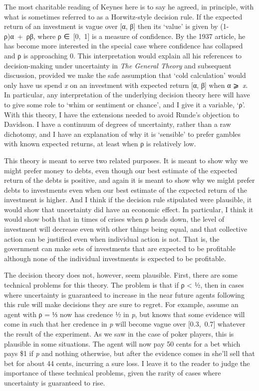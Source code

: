 \documentclass[
  11pt,
  letterpaper,
  DIV=11,
  numbers=noendperiod,
  twoside]{scrartcl}
\begin{document}
The most charitable reading of Keynes here is to say he agreed, in
principle, with what is sometimes referred to as a Horwitz-style
decision rule. If the expected return of an investment is vague over
{[}α, β{]} then its `value' is given by (1-ρ)α~+~ρβ, where ρ
∈~{[}0,~1{]} is a measure of confidence. By the 1937 article, he has
become more interested in the special case where confidence has
collapsed and ρ is approaching 0. This interpretation would explain all
his references to decision-making under uncertainty in \emph{The General
Theory} and subsequent discussion, provided we make the safe assumption
that `cold calculation' would only have us spend \emph{x} on an
investment with expected return {[}α, β{]} when α ⩾~\emph{x}. In
particular, any interpretation of the underlying decision theory here
will have to give some role to `whim or sentiment or chance', and I give
it a variable, `ρ'. With this theory, I have the extensions needed to
avoid Runde's objection to Davidson. I have a continuum of degrees of
uncertainty, rather than a raw dichotomy, and I have an explanation of
why it is `sensible' to prefer gambles with known expected returns, at
least when ρ is relatively low.

This theory is meant to serve two related purposes. It is meant to show
why we might prefer money to debts, even though our best estimate of the
expected return of the debts is positive, and again it is meant to show
why we might prefer debts to investments even when our best estimate of
the expected return of the investment is higher. And I think if the
decision rule stipulated were plausible, it would show that uncertainty
did have an economic effect. In particular, I think it would show both
that in times of crises when ρ heads down, the level of investment will
decrease even with other things being equal, and that collective action
can be justified even when individual action is not. That is, the
government can make sets of investments that are expected to be
profitable although none of the individual investments is expected to be
profitable.

The decision theory does not, however, seem plausible. First, there are
some technical problems for this theory. The problem is that if ρ
\textless{} ½, then in cases where uncertainty is guaranteed to increase
in the near future agents following this rule will make decisions they
are sure to regret. For example, assume an agent with ρ = ⅓ now has
credence ½ in \emph{p}, but knows that some evidence will come in such
that her credence in \emph{p} will become vague over {[}0.3,~0.7{]}
whatever the result of the experiment. As we saw in the case of poker
players, this is plausible in some situations. The agent will now pay 50
cents for a bet which pays \$1 if \emph{p} and nothing otherwise, but
after the evidence comes in she'll sell that bet for about 44 cents,
incurring a sure loss. I leave it to the reader to judge the importance
of these technical problems, given the rarity of cases where uncertainty
is guaranteed to rise.
\end{document}
